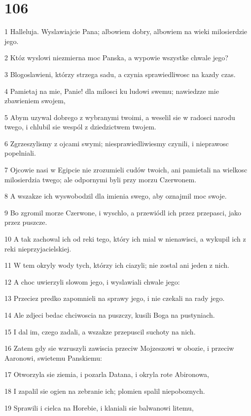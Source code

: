 \chapter{106}

\par 1 Halleluja. Wyslawiajcie Pana; albowiem dobry, albowiem na wieki milosierdzie jego.
\par 2 Któz wyslowi niezmierna moc Panska, a wypowie wszystke chwale jego?
\par 3 Blogoslawieni, którzy strzega sadu, a czynia sprawiedliwosc na kazdy czas.
\par 4 Pamietaj na mie, Panie! dla milosci ku ludowi swemu; nawiedzze mie zbawieniem swojem,
\par 5 Abym uzywal dobrego z wybranymi twoimi, a weselil sie w radosci narodu twego, i chlubil sie wespól z dziedzictwem twojem.
\par 6 Zgrzeszylismy z ojcami swymi; niesprawiedliwiesmy czynili, i nieprawosc popelniali.
\par 7 Ojcowie nasi w Egipcie nie zrozumieli cudów twoich, ani pamietali na wielkosc milosierdzia twego; ale odpornymi byli przy morzu Czerwonem.
\par 8 A wszakze ich wyswobodzil dla imienia swego, aby oznajmil moc swoje.
\par 9 Bo zgromil morze Czerwone, i wyschlo, a przewiódl ich przez przepasci, jako przez puszcze.
\par 10 A tak zachowal ich od reki tego, który ich mial w nienawisci, a wykupil ich z reki nieprzyjacielskiej.
\par 11 W tem okryly wody tych, którzy ich ciazyli; nie zostal ani jeden z nich.
\par 12 A choc uwierzyli slowom jego, i wyslawiali chwale jego:
\par 13 Przeciez predko zapomnieli na sprawy jego, i nie czekali na rady jego.
\par 14 Ale zdjeci bedac chciwoscia na puszczy, kusili Boga na pustyniach.
\par 15 I dal im, czego zadali, a wszakze przepuscil suchoty na nich.
\par 16 Zatem gdy sie wzruszyli zawiscia przeciw Mojzeszowi w obozie, i przeciw Aaronowi, swietemu Panskiemu:
\par 17 Otworzyla sie ziemia, i pozarla Datana, i okryla rote Abironowa,
\par 18 I zapalil sie ogien na zebranie ich; plomien spalil niepoboznych.
\par 19 Sprawili i cielca na Horebie, i klaniali sie balwanowi litemu,
